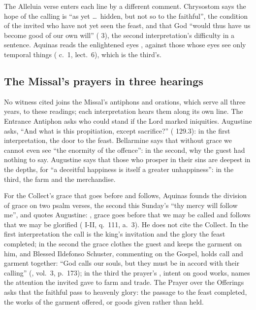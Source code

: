 The Alleluia verse enters each line by a different comment. Chrysostom says the
hope of the calling is ``as yet \ldots\ hidden, but not so to the faithful'',
the condition of the invited who have not yet seen the feast, and that God
``would thus have us become good of our own will'' ( 3), the second interpretation's difficulty in a sentence. Aquinas
reads the enlightened eyes , against those whose eyes see only temporal
things ( c.~1, lect.~6), which is the third's.

\subsection{The Missal's prayers in three hearings}

No witness cited joins the Missal's antiphons and orations, which serve all
three years, to these readings; each interpretation hears them along its own
line. The Entrance Antiphon asks who could stand if the Lord marked
iniquities. Augustine asks, ``And what is this propitiation, except
sacrifice?'' ( 129.3): in the first
interpretation, the door to the feast. Bellarmine says that without grace we
cannot even see ``the enormity of the offence'': in the second, why the guest
had nothing to say. Augustine says that those who prosper in their sins are
deepest in the depths, for ``a deceitful happiness is itself a greater
unhappiness'': in the third, the farm and the merchandise.

For the Collect's grace that goes before and follows, Aquinas founds the
division of grace on two psalm verses, the second this Sunday's ``thy mercy
will follow me'', and quotes Augustine: , grace goes before that we may be called and
follows that we may be glorified ( I-II, q.~111, a.~3).
He does not cite the Collect. In the first interpretation the call is the
king's invitation and the glory the feast completed; in the second the grace
clothes the guest and keeps the garment on him, and Blessed Ildefonso
Schuster, commenting on the Gospel, holds call and garment together: ``God calls our souls, but they must be in
accord with their calling'' (, vol.~3, p.~173); in the
third the prayer's , intent on good works, names the attention
the invited gave to farm and trade. The Prayer over the Offerings asks that
 the faithful pass to heavenly glory:
the passage to the feast completed, the works of the garment offered, or goods
given rather than held.


